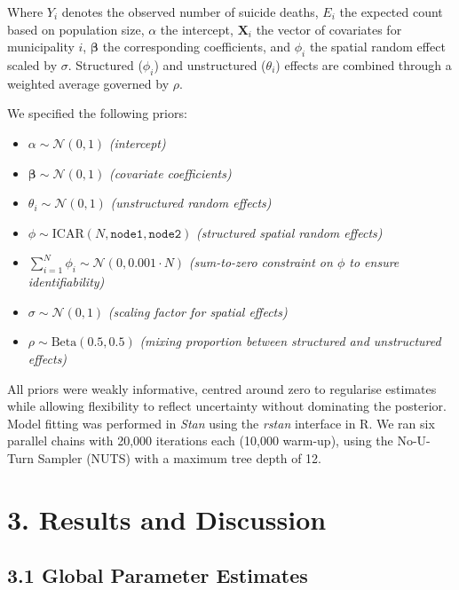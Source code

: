 \documentclass[11pt]{article}
\begin{document}
	Where $Y_i$ denotes the observed number of suicide deaths, $E_i$ the expected count based on population size, $\alpha$ the intercept, $\mathbf{X}_i$ the vector of covariates for municipality $i$, $\boldsymbol{\beta}$ the corresponding coefficients, and $\phi_i$ the spatial random effect scaled by $\sigma$. Structured ($\phi_i$) and unstructured ($\theta_i$) effects are combined through a weighted average governed by $\rho$.
	
	We specified the following priors:
	
	\vspace{1em}
	
	\begin{itemize}
		\item $\alpha \sim \mathcal{N}(0, 1)$ \hfill \textit{(intercept)}
		\item $\boldsymbol{\beta} \sim \mathcal{N}(0, 1)$ \hfill \textit{(covariate coefficients)}
		\item $\theta_i \sim \mathcal{N}(0, 1)$ \hfill \textit{(unstructured random effects)}
		\item $\phi \sim \text{ICAR}(N, \texttt{node1}, \texttt{node2})$ \hfill \textit{(structured spatial random effects)}
		\item $\textstyle \sum_{i=1}^N \phi_i \sim \mathcal{N}(0, 0.001 \cdot N)$ \hfill \textit{(sum-to-zero constraint on $\phi$ to ensure identifiability)}
		\item $\sigma \sim \mathcal{N}(0, 1)$ \hfill \textit{(scaling factor for spatial effects)}
		\item $\rho \sim \text{Beta}(0.5, 0.5)$ \hfill \textit{(mixing proportion between structured and unstructured effects)}
	\end{itemize}
	
	\vspace{1em}
	
	All priors were weakly informative, centred around zero to regularise estimates while allowing flexibility to reflect uncertainty without dominating the posterior. Model fitting was performed in \textit{Stan} using the \textit{rstan} interface in R. We ran six parallel chains with 20,000 iterations each (10,000 warm-up), using the No-U-Turn Sampler (NUTS) with a maximum tree depth of 12.
	
	\newpage
	\section*{3. Results and Discussion}
	
	\subsection*{3.1 Global Parameter Estimates}
	
\end{document}
